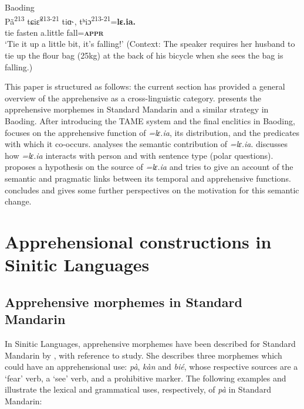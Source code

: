 \documentclass[output=paper,colorlinks,citecolor=brown, language=chinese]{langscibook}
\begin{document}
\ea\label{ex:Song4} \textnormal{Baoding}\\
\gll Pã\textsuperscript{213} tɕiɛ̃\textsuperscript{213-21} tiɑ˞, tʰiɔ\textsuperscript{213-21}=\textbf{lɛ.ia.} \\
tie fasten a.little fall=\textsc{\textbf{appr}} \\
\glt `Tie it up a little bit, it's falling!' (Context: The speaker requires her husband to tie up the flour bag (25kg) at the back of his bicycle when she sees the bag is falling.)
\z

This paper is structured as follows: the current section has provided a general overview of the apprehensive as a cross-linguistic category.  presents the apprehensive morphemes in Standard Mandarin and a similar strategy in Baoding. After introducing the TAME system and the final enclitics in Baoding,  focuses on the apprehensive function of \textit{=lɛ.ia}, its distribution, and the predicates with which it co-occurs.  analyses the semantic contribution of \textit{=lɛ.ia}.  discusses how \textit{=lɛ.ia}  interacts with person and with sentence type (polar questions).  proposes a hypothesis on the source of \textit{=lɛ.ia} and tries to give an account of the semantic and pragmatic links between its temporal and apprehensive functions.  concludes and gives some further perspectives on the motivation for this semantic change.


\section{Apprehensional constructions in Sinitic Languages}
\label{sec:apprsinitic}

\subsection{Apprehensive morphemes in Standard Mandarin}
\label{subsec:apprmandarin}

In Sinitic Languages, apprehensive morphemes have been described for Standard Mandarin by \citet{Gao2003}, with reference to  study. She describes three morphemes  which could have an apprehensional use: \textit{pà}, \textit{kàn} and \textit{bié}, whose respective sources are a `fear' verb, a `see' verb, and a prohibitive marker. The following examples  and  illustrate the lexical and grammatical uses, respectively, of \textit{pà} in Standard Mandarin:
\end{document}
